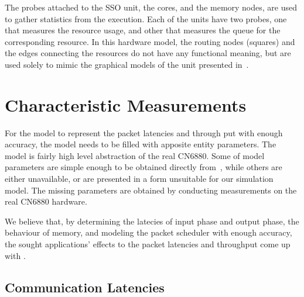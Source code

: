 The probes attached to the SSO unit, the cores, and the memory nodes, are used to gather statistics from the execution. Each of the units have two probes, one that measures the resource usage, and other that measures the queue for the corresponding resource. In this hardware model, the routing nodes (squares) and the edges connecting the resources do not have any functional meaning, but are used solely to mimic the graphical models of the unit presented in~\cite{cavium:2010:fundamentals}.

\section{Characteristic Measurements}
\label{sec:characteristic-measurements}

For the model to represent the packet latencies and through put with enough accuracy, the model needs to be filled with apposite entity parameters. The model is fairly high level abstraction of the real CN6880. Some of model parameters are simple enough to be obtained directly from~\cite{cavium:2010:fundamentals}, while others are either unavailable, or are presented in a form unsuitable for our simulation model. The missing parameters are obtained by conducting measurements on the real CN6880 hardware.

We believe that, by determining the latecies of input phase and output phase, the behaviour of memory, and modeling the packet scheduler with enough accuracy, the sought applications' effects to the packet latencies and throughput come up with .



\subsection{Communication Latencies}

